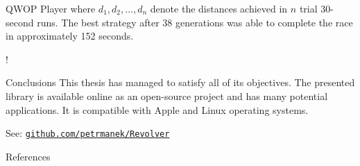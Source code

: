 \documentclass[a0paper,portrait]{baposter}
\begin{document}
\begin{poster}
\begin{posterbox}[name=qwop,column=2]{QWOP Player}
	where $d_1,d_2,\dots,d_n$ denote the distances achieved in $n$ trial 30-second runs. The best strategy after 38 generations was able to complete the race in approximately 152 seconds.

	\vspace{-1.4em}

	\begin{center}
		\resizebox {\columnwidth} {!} {
		}
	\end{center}
\end{posterbox}

\begin{posterbox}[name=conclusion,column=2,below=qwop]{Conclusions}
	This thesis has managed to satisfy all of its objectives. The presented library is available online as an open-source project and has many potential applications. It is compatible with Apple and Linux operating systems.

	\vspace{2em}

	\hfill See: \href{https://github.com/petrmanek/Revolver}{\texttt{github.com/petrmanek/Revolver}}
\end{posterbox}

\begin{posterbox}[name=ref,column=2,below=conclusion,bottomaligned=car]{References}
	\smaller
     
     
     \renewcommand{\section}[2]{\vskip 0.05em}
     
\end{posterbox}

\end{poster}
\end{document}
